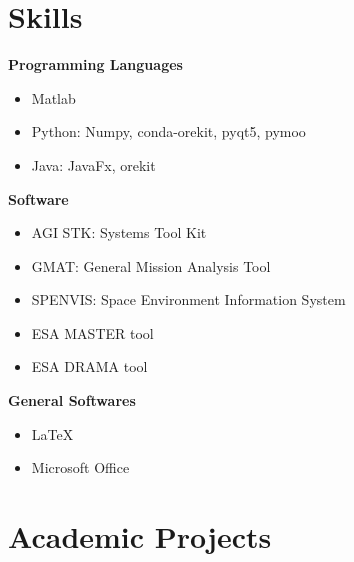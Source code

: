 \documentclass[10pt,a4paper,times]{moderncv}
\begin{document}
\section{Skills}
\textbf{Programming Languages}
\begin{itemize}
\item {Matlab}
\item{Python: Numpy, conda-orekit, pyqt5, pymoo}
\item{Java: JavaFx, orekit}
\end{itemize}
\textbf{Software}
\begin{itemize}
\item{AGI STK: Systems Tool Kit}
\item{GMAT: General Mission Analysis Tool}
\item{SPENVIS: Space Environment Information System}
\item{ESA MASTER tool}
\item{ESA DRAMA tool}
\end{itemize}
\textbf{General Softwares}
\begin{itemize}
\item {LaTeX}
\item {Microsoft Office}
\end{itemize}

\section{Academic Projects}
\end{document}
